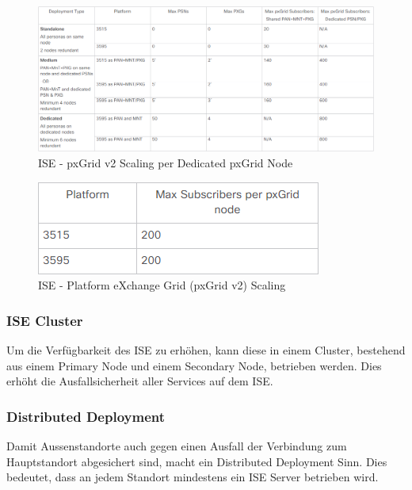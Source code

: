 \begin{figure}[H]
	\centering
	\includegraphics[width=1\linewidth]{img/Absicherung/ISE-PlatformpxGridV2Scaling}
	\caption{ISE - pxGrid v2 Scaling per Dedicated pxGrid Node \cite{ise-scale}}
	\label{fig:ISE - pxGrid v2 Scaling per Dedicated pxGrid Node}
\end{figure}

\begin{figure}[H]
	\centering
	\includegraphics[width=0.5\linewidth]{img/Absicherung/ISE-pxGridV2}
	\caption{ISE - Platform eXchange Grid (pxGrid v2) Scaling \cite{ise-scale}}
	\label{fig:ISE - Platform eXchange Grid (pxGrid v2) Scaling}
\end{figure}

\subsubsection{ISE Cluster}

Um die Verfügbarkeit des ISE zu erhöhen, kann diese in einem Cluster, bestehend aus einem Primary Node und einem Secondary Node, betrieben werden. Dies erhöht die Ausfallsicherheit aller Services auf dem ISE.

\subsubsection{Distributed Deployment}

Damit Aussenstandorte auch gegen einen Ausfall der Verbindung zum Hauptstandort abgesichert sind, macht ein Distributed Deployment Sinn. Dies bedeutet, dass an jedem Standort mindestens ein ISE Server betrieben wird. 

